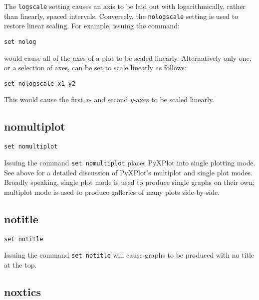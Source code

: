 \documentclass[a4paper,onecolumn,11pt]{book}
\begin{document}
The {\tt logscale} setting causes an axis to be laid out with logarithmically,
rather than linearly, spaced intervals. Conversely, the {\tt nologscale} setting
is used to restore linear scaling. For example, issuing the command:

\begin{verbatim}
set nolog 
\end{verbatim}

\noindent would cause all of the axes of a plot to be scaled linearly. Alternatively only one,
or a selection of axes, can be set to scale linearly as follows:

\begin{verbatim}
set nologscale x1 y2
\end{verbatim}

This would cause the first $x$- and second $y$-axes to be scaled linearly.


\subsection{nomultiplot}

\begin{verbatim}
set nomultiplot
\end{verbatim}

Issuing the command {\tt set nomultiplot} places PyXPlot into single plotting
mode.  See above for a detailed discussion of PyXPlot's multiplot and
single plot modes. Broadly speaking, single plot mode is used to produce single
graphs on their own; multiplot mode is used to produce galleries of many plots
side-by-side.


\subsection{notitle}

\begin{verbatim}
set notitle
\end{verbatim}

Issuing the command {\tt set notitle} will cause graphs to be produced with no
title at the top.


\subsection{noxtics}
\end{document}
